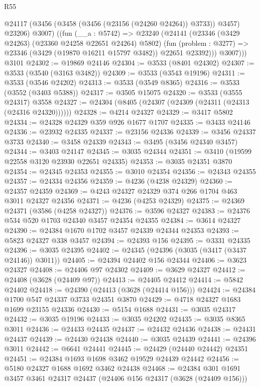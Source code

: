 \begin{lexlean}{R55}
\begin{coremodule}
        @24117 (@3456 (@3458 (@3456 (@23156 (@24260 @24264)) @3733)) @3457) @23206)
          @3007)
        ((fun (__a : @5742) =>
        @23240
          (@24141
            (@23346 (@3429 @24263) (@23360 @24258 @22651 @24264) @5802)
            (fun (problem : @3277) => @23346 (@3429 (@19870 @16211 @15797 @3482)) @22651 @23392)))
          @3007)))
    @3101
@24302 := @19869 @24146
@24304 := @3533 (@8401 @24302)
@24307 := @3533 (@3540 (@3163 @3482))
@24309 := @3533 (@3543 @19196)
@24311 := @3533 (@3546 @24202)
@24313 := @3533 (@3549 @8365)
@24316 := @3533 (@3552 (@3403 @5388))
@24317 := @3505 @15075
@24320 := @3533 (@3555 @24317) @3558
@24327 := @24304 (@8405 (@24307 (@24309 (@24311 (@24313 (@24316 @24320))))))
@24328 := @4214 @24327
@24329 := @3417 @5802
@24334 := @24328 @24329 @359 @926 @1677 @1707
@24335 := @3433 @24146
@24336 := @23932 @24335
@24337 := @23156 @24336
@24339 := @3456 @24337 @3733
@24340 := @3458 @24339
@24343 := @3495 (@3456 @24340 @3457)
@24344 := @3403 @24147
@24345 := @3035 @24344
@24351 := @3410 (@19599 @22558 @3120 @23930 @22651 @24335)
@24353 := @3035 @24351 @3870
@24354 := @24345 @24353
@24355 := @3010 @24354
@24356 := @24343 @24355
@24357 := @24334 @24356
@24359 := @4236 (@4238 @24329)
@24360 := @24357 @24359
@24369 := @4243 @24327 @24329 @374 @266 @1704 @463 @3011 @24327 @24356
@24371 := @4236 (@4253 @24329)
@24375 := @24369 @24371 (@3586 (@4258 @24327))
@24376 := @3596 @24327
@24383 := @24376 @534 @520 @1703 @24340 @3457 @24354 @24355
@24384 := @3614 @24327
@24390 := @24384 @1670 @1702 @3457 @24339 @24344 @24353
@24393 := @5823 @24327 @338 @3457
@24394 := @24393 @156
@24395 := @3331 @24335
@24396 := @3035 @24395
@24402 := @24345 (@24396 (@3035 (@3417 (@3437 @24146)) @3011))
@24405 := @24394 @24402 @156 @24344
@24406 := @3623 @24327
@24408 := @24406 @97 @24302
@24409 := @3629 @24327
@24412 := @24408 (@3628 (@24409 @97))
@24413 := @24405 @24412
@24414 := @5842 @24402
@24418 := @24390 (@24413 (@3628 (@24414 @156)))
@24424 := @24384 @1700 @547 @24337 @3733 @24351 @3870
@24429 := @4718 @24327 @1683 @1699 @23155 @24336
@24430 := @5154 @1688
@24431 := @3035 @24317
@24432 := @3035 @19196
@24433 := @3035 @24202
@24435 := @3035 @8365 @3011
@24436 := @24433 @24435
@24437 := @24432 @24436
@24438 := @24431 @24437
@24439 := @24430 @24438
@24440 := @3035 @24439
@24441 := @24396 @3011
@24442 := @6641 @24441
@24445 := @24429 (@24440 @24442) @24351
@24451 := @24384 @1693 @1698 @3462 @19529 @24439 @24442
@24456 := @5180 @24327 @1688 @1692 @3462 @24438
@24468 := @24384 @301 @1691 @3457 @3461 @24317 @24437 (@24406 @156 @24317 (@3628 (@24409 @156)))

\end{coremodule}
\end{lexlean}
